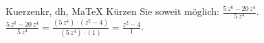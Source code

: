 \begin{MAufgabe}{Kuerzen}{kr, dh, MaTeX}
K\"urzen Sie soweit m\"oglich: $\frac{5\, z^6 - 20\, z^4}{5\, z^4}$.\\ 
\ifLsg\MLoesung
\quad $\frac{5\, z^6 - 20\, z^4}{5\, z^4}=\frac{(5\, z^4)\cdot(z^2 - 4)}{(5\, z^4)\cdot(1)}=\frac{z^2 - 4}{1}$.\else\relax\fi
 \end{MAufgabe}